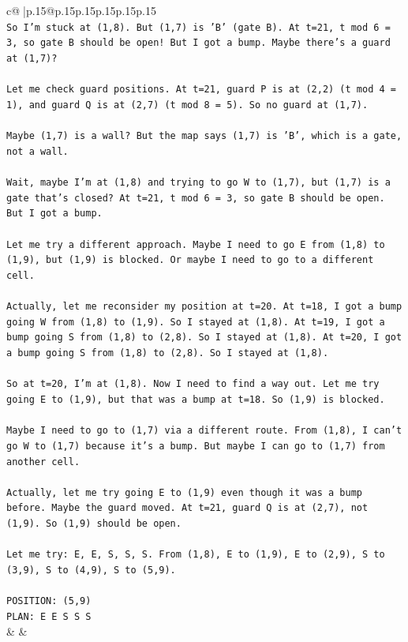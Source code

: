\documentclass{article}
\begin{document}
{\begin{supertabular}{c@{$\;$}|p{.15\linewidth}@{}p{.15\linewidth}p{.15\linewidth}p{.15\linewidth}p{.15\linewidth}p{.15\linewidth}}
{{{\\ 
\texttt{So I'm stuck at (1,8). But (1,7) is 'B' (gate B). At t=21, t mod 6 = 3, so gate B should be open! But I got a bump. Maybe there's a guard at (1,7)?} \\
\\ 
\texttt{Let me check guard positions. At t=21, guard P is at (2,2) (t mod 4 = 1), and guard Q is at (2,7) (t mod 8 = 5). So no guard at (1,7).} \\
\\ 
\texttt{Maybe (1,7) is a wall? But the map says (1,7) is 'B', which is a gate, not a wall.} \\
\\ 
\texttt{Wait, maybe I'm at (1,8) and trying to go W to (1,7), but (1,7) is a gate that's closed? At t=21, t mod 6 = 3, so gate B should be open. But I got a bump.} \\
\\ 
\texttt{Let me try a different approach. Maybe I need to go E from (1,8) to (1,9), but (1,9) is blocked. Or maybe I need to go to a different cell.} \\
\\ 
\texttt{Actually, let me reconsider my position at t=20. At t=18, I got a bump going W from (1,8) to (1,9). So I stayed at (1,8). At t=19, I got a bump going S from (1,8) to (2,8). So I stayed at (1,8). At t=20, I got a bump going S from (1,8) to (2,8). So I stayed at (1,8).} \\
\\ 
\texttt{So at t=20, I'm at (1,8). Now I need to find a way out. Let me try going E to (1,9), but that was a bump at t=18. So (1,9) is blocked.} \\
\\ 
\texttt{Maybe I need to go to (1,7) via a different route. From (1,8), I can't go W to (1,7) because it's a bump. But maybe I can go to (1,7) from another cell.} \\
\\ 
\texttt{Actually, let me try going E to (1,9) even though it was a bump before. Maybe the guard moved. At t=21, guard Q is at (2,7), not (1,9). So (1,9) should be open.} \\
\\ 
\texttt{Let me try: E, E, S, S, S. From (1,8), E to (1,9), E to (2,9), S to (3,9), S to (4,9), S to (5,9).} \\
\\ 
\texttt{POSITION: (5,9)} \\
\texttt{PLAN: E E S S S} \\
            }
        }
    }
    & & \\ \\


\end{supertabular}}
\end{document}
